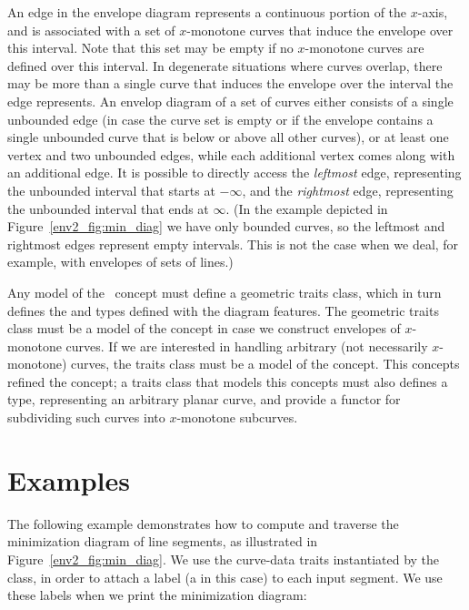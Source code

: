 An edge in the envelope diagram represents a continuous portion of the
$x$-axis, and is associated with a set of $x$-monotone curves that
induce the envelope over this interval. Note that this set may be
empty if no $x$-monotone curves are defined over this interval. In
degenerate situations where curves overlap, there may be more than
a single curve that induces the envelope over the interval the edge
represents. An envelop diagram of a set of curves either consists of
a single unbounded edge (in case the curve set is empty or if the
envelope contains a single unbounded curve that is below or above
all other curves), or at least one vertex and two unbounded edges,
while each additional vertex comes along with an additional edge. It
is possible to directly access the {\em leftmost} edge, representing
the unbounded interval that starts at $-\infty$, and the {\em rightmost}
edge, representing the unbounded interval that ends at $\infty$.
(In the example depicted in Figure~\ref{env2_fig:min_diag} we have
only bounded curves, so the leftmost and rightmost edges represent
empty intervals. This is not the case when we deal, for example, with
envelopes of sets of lines.)

Any model of the \ccRefName\ concept must define a geometric
traits class, which in turn defines the  and 
 types defined with the diagram features.
The geometric traits class must be a model of the 
 concept in case we construct
envelopes of $x$-monotone curves. If we are interested in handling
arbitrary (not necessarily $x$-monotone) curves, the traits class
must be a model of the  concept. This
concepts refined the  concept;
a traits class that models this concepts must also defines a
 type, representing an arbitrary planar curve, and
provide a functor for subdividing such curves into $x$-monotone
subcurves.

\section{Examples}

The following example demonstrates how to compute and traverse the
minimization diagram of line segments, as illustrated in
Figure~\ref{env2_fig:min_diag}. We use the curve-data traits
instantiated by the  class, in order to
attach a label (a  in this case) to each input segment.
We use these labels when we print the minimization diagram:

